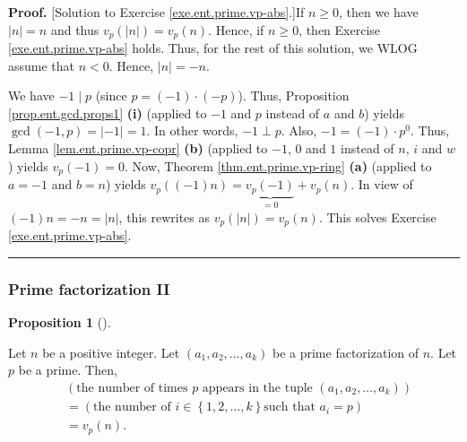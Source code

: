 \documentclass[numbers=enddot,12pt,final,onecolumn,notitlepage]{scrartcl}%
\numberwithin{exer}{subsection}
\theoremstyle{definition}
\newtheorem{prop}[theo]{Proposition}
\newenvironment{proposition}[1][]
{\begin{prop}[#1]\begin{leftbar}}
{\end{leftbar}\end{prop}}
\newenvironment{fineprint}{\begin{small}}{\end{small}}
\newenvironment{proof}[1][Proof]{\noindent\textbf{#1.} }{\ \rule{0.5em}{0.5em}}
\begin{document}
\begin{fineprint}
\begin{proof}
[Solution to Exercise \ref{exe.ent.prime.vp-abs}.]If $n\geq0$, then we have
$\left\vert n\right\vert =n$ and thus $v_{p}\left(  \left\vert n\right\vert
\right)  =v_{p}\left(  n\right)  $. Hence, if $n\geq0$, then Exercise
\ref{exe.ent.prime.vp-abs} holds. Thus, for the rest of this solution, we WLOG
assume that $n<0$. Hence, $\left\vert n\right\vert =-n$.

We have $-1\mid p$ (since $p=\left(  -1\right)  \cdot\left(  -p\right)  $).
Thus, Proposition \ref{prop.ent.gcd.props1} \textbf{(i)} (applied to $-1$ and
$p$ instead of $a$ and $b$) yields $\gcd\left(  -1,p\right)  =\left\vert
-1\right\vert =1$. In other words, $-1\perp p$. Also, $-1=\left(  -1\right)
\cdot p^{0}$. Thus, Lemma \ref{lem.ent.prime.vp-copr} \textbf{(b)} (applied to
$-1$, $0$ and $1$ instead of $n$, $i$ and $w$) yields $v_{p}\left(  -1\right)
=0$. Now, Theorem \ref{thm.ent.prime.vp-ring} \textbf{(a)} (applied to $a=-1$
and $b=n$) yields $v_{p}\left(  \left(  -1\right)  n\right)
=\underbrace{v_{p}\left(  -1\right)  }_{=0}+v_{p}\left(  n\right)  $. In view
of $\left(  -1\right)  n=-n=\left\vert n\right\vert $, this rewrites as
$v_{p}\left(  \left\vert n\right\vert \right)  =v_{p}\left(  n\right)  $. This
solves Exercise \ref{exe.ent.prime.vp-abs}.
\end{proof}
\end{fineprint}

\subsubsection{Prime factorization II}

\begin{proposition}
\label{prop.ent.prime.mult-in-pf}Let $n$ be a positive integer. Let $\left(
a_{1},a_{2},\ldots,a_{k}\right)  $ be a prime factorization of $n$. Let $p$ be
a prime. Then,%
\begin{align*}
&  \left(  \text{the number of times }p\text{ appears in the tuple }\left(
a_{1},a_{2},\ldots,a_{k}\right)  \right) \\
&  =\left(  \text{the number of }i\in\left\{  1,2,\ldots,k\right\}  \text{
such that }a_{i}=p\right) \\
&  =v_{p}\left(  n\right)  .
\end{align*}

\end{proposition}
\end{document}
